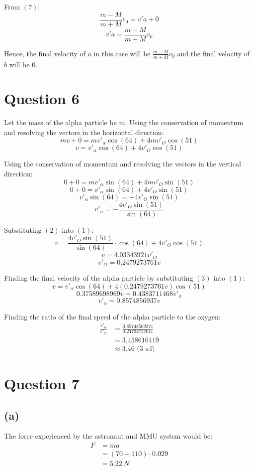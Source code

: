 \documentclass[11pt]{article}
\begin{document}
From \((7)\):
\[\frac{m - M}{m + M} v_0 = v'a + 0\]
\[v'a = \frac{m - M}{m + M} v_0\]

Hence, the final velocity of \(a\) in this case will be \(\frac{m - M}{m + M} v_0\) and the final velocity of \(b\) will be 0.

\section{Question 6}
\label{sec:org11e1223}
Let the mass of the alpha particle be \(m\). Using the conservation of momentum and resolving the vectors in the horizontal direction:
\[mv + 0 = mv'_{\alpha} \cos (64) + 4mv'_O \cos (51)\]
\[v = v'_{\alpha} \cos (64) + 4v'_O \cos (51) \tag{1}\]

Using the conservation of momentum and resolving the vectors in the vertical direction:
\[0 + 0 = mv'_{\alpha} \sin (64) + 4mv'_O \sin (51)\]
\[0 + 0 = v'_{\alpha} \sin (64) + 4v'_O \sin (51)\]
\[v'_{\alpha} \sin (64) = - 4v'_O \sin (51)\]
\[v'_{\alpha} = - \frac{4v'_O \sin (51)}{\sin (64)} \tag{2}\]

Substituting \((2)\) into \((1)\):
\[v = \frac{4v'_O \sin (51)}{\sin (64)} \cdot \cos (64) + 4v'_O \cos (51)\]
\[v = 4.03343921v'_O\]
\[v'_O = 0.2479273761v \tag{3}\]

Finding the final velocity of the alpha particle by substituting \((3)\) into \((1)\):
\[v = v'_{\alpha} \cos (64) + 4(0.2479273761v) \cos (51)\]
\[0.37589698969v = 0.4383711468v'_{\alpha}\]
\[v'_{\alpha} = 0.8574856937v\]

Finding the ratio of the final speed of the alpha particle to the oxygen:
\begin{align*}
\frac{v'_{\alpha}}{v'_O} &= \frac{0.8574856937v}{0.2479273761v} \\
&= 3.458616419 \\
&\approx 3.46 \text{ (3 s.f)}
\end{align*}

\section{Question 7}
\label{sec:org965e2df}

\subsection{(a)}
\label{sec:org435a8c2}
The force experienced by the astronaut and MMU system would be:
\begin{align*}
F &= ma \\
&= (70 + 110) \cdot 0.029 \\
&= \qty{5.22}{\unit{N}}
\end{align*}
\end{document}
